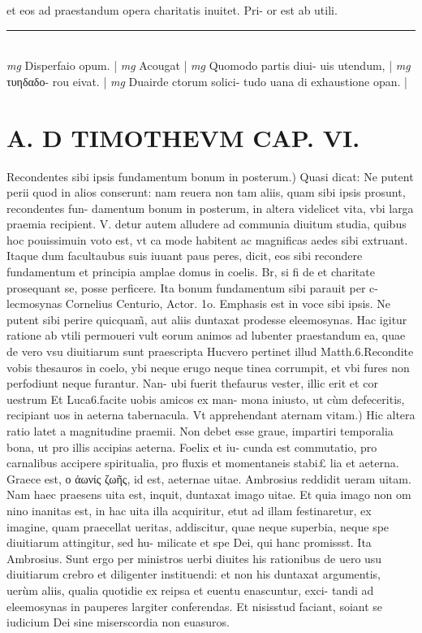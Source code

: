 \documentclass{article}
\begin{document}
\begin{pages}
et eos ad praestandum opera charitatis inuitet. Pri- or est ab utili.  \pend
\vspace{0.5cm}\noindent
\vspace{0.2cm}\rule{1cm}{0.2pt}\\ 
\hspace{0.2cm}\textit{mg}
\footnotesize Disperfaio opum. 
\normalsize| 
\hspace{0.2cm}\textit{mg}
\footnotesize Acougat 
\normalsize| 
\hspace{0.2cm}\textit{mg}
\footnotesize Quomodo partis diui- uis utendum, 
\normalsize| 
\hspace{0.2cm}\textit{mg}
\footnotesize τυηδαδο- rou eivat. 
\normalsize| 
\hspace{0.2cm}\textit{mg}
\footnotesize Duairde ctorum solici- tudo uana di exhaustione opan. 
\normalsize| 
\section*{A. D TIMOTHEVM CAP. VI. }
\marginpar{[ p.133 ]}\pstart Recondentes sibi ipsis fundamentum bonum in posterum.) Quasi dicat: Ne putent perii quod in alios conserunt: nam reuera non tam aliis, quam sibi ipsis prosunt, recondentes fun- damentum bonum in posterum, in altera videlicet vita, vbi larga praemia recipient. V. detur autem alludere ad communia diuitum studia, quibus hoc pouissimuin voto est, vt ca mode habitent ac magnificas aedes sibi extruant. Itaque dum facultaubus suis iuuant paus peres, dicit, eos sibi recondere fundamentum et principia amplae domus in coelis. Br, si fi de et charitate prosequant se, posse perficere. Ita bonum fundamentum sibi parauit per c- lecmosynas Cornelius Centurio, Actor. 1o. Emphasis est in voce sibi ipsis. Ne putent sibi perire quicquam̃, aut aliis duntaxat prodesse eleemosynas. Hac igitur ratione ab vtili permoueri vult eorum animos ad lubenter praestandum ea, quae de vero vsu diuitiarum sunt praescripta Hucvero pertinet illud Matth.6.Recondite vobis thesauros in coelo, ybi neque erugo neque tinea corrumpit, et vbi fures non perfodiunt neque furantur. Nan- ubi fuerit thefaurus vester, illic erit et cor uestrum Et Luca6.facite uobis amicos ex man- mona iniusto, ut cùm defeceritis, recipiant uos in aeterna tabernacula.  \pend\pstart Vt apprehendant aternam vitam.) Hic altera ratio latet a magnitudine praemii. Non debet esse graue, impartiri temporalia bona, ut pro illis accipias aeterna. Foelix et iu- cunda est commutatio, pro carnalibus accipere spiritualia, pro fluxis et momentaneis stabi£ lia et aeterna. Graece est, ο ἀωνίς ζωῆς, id est, aeternae uitae. Ambrosius reddidit ueram uitam. Nam haec praesens uita est, inquit, duntaxat imago uitae. Et quia imago non om nino inanitas est, in hac uita illa acquiritur, etut ad illam festinaretur, ex imagine, quam praecellat ueritas, addiscitur, quae neque superbia, neque spe diuitiarum attingitur, sed hu- milicate et spe Dei, qui hanc promissst. Ita Ambrosius. Sunt ergo per ministros uerbi diuites his rationibus de uero usu diuitiarum crebro et diligenter instituendi: et non his duntaxat argumentis, uerùm aliis, qualia quotidie ex reipsa et euentu enascuntur, exci- tandi ad eleemosynas in pauperes largiter conferendas. Et nisisstud faciant, soiant se iudicium Dei sine miserscordia non euasuros.  \pend

\end{pages}
\end{document}
